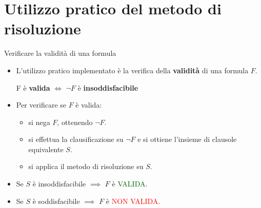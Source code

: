 \documentclass{beamer}
\begin{document}
\section{Utilizzo pratico del metodo di risoluzione}

\begin{frame}{Verificare la validità di una formula}
    \begin{itemize}
        \item L'utilizzo pratico implementato è la verifica della \textbf{validità} di una formula $F$.
        \vspace{5px}
        \begin{center}
            F è \textbf{valida} $\iff$ $\lnot F$ è \textbf{insoddisfacibile}
        \end{center}
        \vspace{5px}
        \item Per verificare se $F$ è valida:
        \begin{itemize}
            \item si nega $F$, ottenendo $\lnot F$.
            \item si effettua la clausificazione su $\lnot F$ e si ottiene l'insieme di clausole equivalente $S$.
            \item si applica il metodo di risoluzione su $S$.
        \end{itemize}
        \item Se $S$ è insoddisfacibile $\implies$ $F$ è \textcolor{darkgreen}{VALIDA}.
        \item Se $S$ è soddisfacibile $\implies$ $F$ è \textcolor{red}{NON VALIDA}.
    \end{itemize}
\end{frame}
\end{document}
